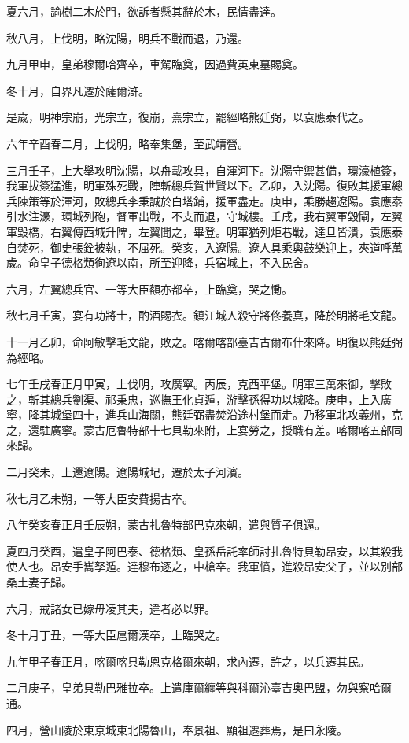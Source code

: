 \begin{pinyinscope}
夏六月，諭樹二木於門，欲訴者懸其辭於木，民情盡達。

秋八月，上伐明，略沈陽，明兵不戰而退，乃還。

九月甲申，皇弟穆爾哈齊卒，車駕臨奠，因過費英東墓賜奠。

冬十月，自界凡遷於薩爾滸。

是歲，明神宗崩，光宗立，復崩，熹宗立，罷經略熊廷弼，以袁應泰代之。

六年辛酉春二月，上伐明，略奉集堡，至武靖營。

三月壬子，上大舉攻明沈陽，以舟載攻具，自渾河下。沈陽守禦甚備，環濠植簽，我軍拔簽猛進，明軍殊死戰，陣斬總兵賀世賢以下。乙卯，入沈陽。復敗其援軍總兵陳策等於渾河，敗總兵李秉誠於白塔鋪，援軍盡走。庚申，乘勝趨遼陽。袁應泰引水注濠，環城列砲，督軍出戰，不支而退，守城樓。壬戌，我右翼軍毀閘，左翼軍毀橋，右翼傅西城升陴，左翼聞之，畢登。明軍猶列炬巷戰，達旦皆潰，袁應泰自焚死，御史張銓被執，不屈死。癸亥，入遼陽。遼人具乘輿鼓樂迎上，夾道呼萬歲。命皇子德格類徇遼以南，所至迎降，兵宿城上，不入民舍。

六月，左翼總兵官、一等大臣額亦都卒，上臨奠，哭之慟。

秋七月壬寅，宴有功將士，酌酒賜衣。鎮江城人殺守將佟養真，降於明將毛文龍。

十一月乙卯，命阿敏擊毛文龍，敗之。喀爾喀部臺吉古爾布什來降。明復以熊廷弼為經略。

七年壬戌春正月甲寅，上伐明，攻廣寧。丙辰，克西平堡。明軍三萬來御，擊敗之，斬其總兵劉渠、祁秉忠，巡撫王化貞遁，游擊孫得功以城降。庚申，上入廣寧，降其城堡四十，進兵山海關，熊廷弼盡焚沿途村堡而走。乃移軍北攻義州，克之，還駐廣寧。蒙古厄魯特部十七貝勒來附，上宴勞之，授職有差。喀爾喀五部同來歸。

二月癸未，上還遼陽。遼陽城圮，遷於太子河濱。

秋七月乙未朔，一等大臣安費揚古卒。

八年癸亥春正月壬辰朔，蒙古扎魯特部巴克來朝，遣與質子俱還。

夏四月癸酉，遣皇子阿巴泰、德格類、皇孫岳託率師討扎魯特貝勒昂安，以其殺我使人也。昂安手巂孥遁。達穆布逐之，中槍卒。我軍憤，進殺昂安父子，並以別部桑土妻子歸。

六月，戒諸女已嫁毋凌其夫，違者必以罪。

冬十月丁丑，一等大臣扈爾漢卒，上臨哭之。

九年甲子春正月，喀爾喀貝勒恩克格爾來朝，求內遷，許之，以兵遷其民。

二月庚子，皇弟貝勒巴雅拉卒。上遣庫爾纏等與科爾沁臺吉奧巴盟，勿與察哈爾通。

四月，營山陵於東京城東北陽魯山，奉景祖、顯祖遷葬焉，是曰永陵。


\end{pinyinscope}
